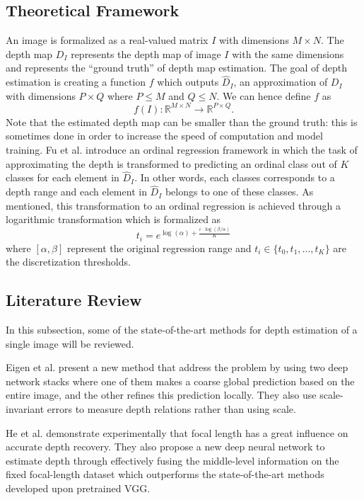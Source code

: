 \documentclass[12pt,twoside]{article}
\begin{document}
\subsection{Theoretical Framework}
An image is formalized as a real-valued matrix $I$ with dimensions $M \times N$. The depth map $D_I$ represents the depth map of image $I$ with the same dimensions and represents the ``ground truth'' of depth map estimation. The goal of depth estimation is creating a function $f$ which outputs $\hat{D}_I$, an approximation of $D_I$ with dimensions $P \times Q$ where $P \leq M$ and $Q \leq N$. 
We can hence define $f$ as
\[
    f(I): \mathbb{R}^{M \times N} \rightarrow \mathbb{R}^{P \times Q}.
\]
Note that the estimated depth map can be smaller than the ground truth: this is sometimes done in order to increase the speed of computation and model training.
\smallskip
Fu et al. \cite{huan_fu_deep_2018} introduce an ordinal regression framework in which the task of approximating the depth is transformed to predicting an ordinal class out of $K$ classes for each element in $\hat{D}_I$. In other words, each classes corresponds to a depth range and each element in $\hat{D}_I$ belongs to one of these classes. As mentioned, this transformation to an ordinal regression is achieved through a logarithmic transformation which is formalized as
\[
    t_i = e^{\log(\alpha) + \frac{i\cdot\log(\beta/\alpha)}{K}}
\]
where $[\alpha, \beta]$ represent the original regression range and $t_i \in \{t_0, t_1, \ldots, t_K\}$ are the discretization thresholds.


\subsection{Literature Review}
In this subsection, some of the state-of-the-art methods for depth estimation of a single image will be reviewed.

Eigen et al. \cite{david_eigen_depth_2014} present a new method that address the problem by using two deep network stacks where one of them makes a coarse global prediction based on the entire image, and the other refines this prediction locally. They also use scale-invariant errors to measure depth relations rather than using scale.  

He et al. \cite{lei_he_learning_2018} demonstrate experimentally that focal length has a great influence on accurate depth recovery. They also propose a new deep neural network to estimate depth through effectively fusing the middle-level information on the fixed focal-length dataset which outperforms the state-of-the-art methods developed upon pretrained VGG.
\end{document}
